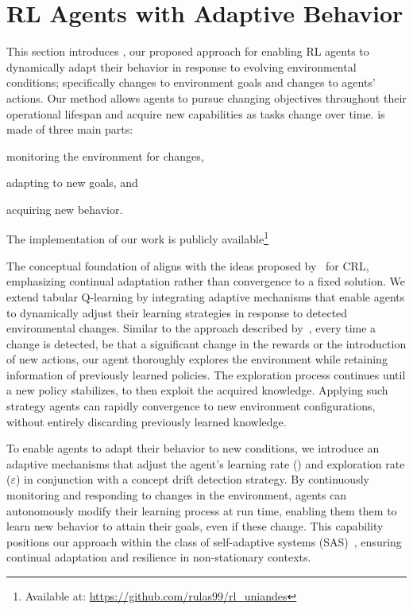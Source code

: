 
\section{\ac{RL} Agents with Adaptive Behavior}
\label{sec:implementation}

This section introduces \adaptiverl, our proposed approach for enabling \ac{RL} agents to dynamically 
adapt their behavior in response to evolving environmental conditions; specifically changes to 
environment goals and changes to agents' actions. Our method allows agents to pursue changing 
objectives throughout their operational lifespan and acquire new capabilities as tasks change over 
time. \adaptiverl is made of three main parts:
\begin{enumerate*}[label=(\arabic*)]
\item monitoring the environment for changes,
\item adapting to new goals, and
\item acquiring new behavior.
\end{enumerate*}
The implementation of our work is publicly available\footnote{Available at: \url{https://github.com/rulas99/rl_uniandes}}  

The conceptual foundation of \adaptiverl aligns with the ideas proposed 
by~\citet{abel2023definitioncontinualreinforcementlearning} for \ac{CRL}, emphasizing continual 
adaptation rather than convergence to a fixed solution. We extend tabular Q-learning by integrating 
adaptive mechanisms that enable agents to dynamically adjust their learning strategies in response 
to detected environmental changes. Similar to the approach described 
by~\citet{norman2024firstexploreexploitmetalearningsolve}, every time a change is detected, be that 
a significant change in the rewards or the introduction of new actions, our agent thoroughly explores 
the environment while retaining information of previously learned policies. The exploration process 
continues until a new policy stabilizes, to then exploit the acquired knowledge. Applying such strategy 
agents can rapidly convergence to new environment configurations, without entirely discarding 
previously learned knowledge.

To enable agents to adapt their behavior to new conditions, we introduce an adaptive mechanisms 
that adjust the agent’s learning rate (\lrate{\alpha}) and exploration rate ($\varepsilon$) in conjunction 
with a concept drift detection strategy. By continuously monitoring and responding to changes in the 
environment, agents can autonomously modify their learning process at run time, enabling them them 
to learn new behavior to attain their goals, even if these change. This capability positions our approach 
within the class of self-adaptive systems (SAS)~\cite{sasreview}, ensuring continual adaptation and 
resilience in non-stationary contexts.

